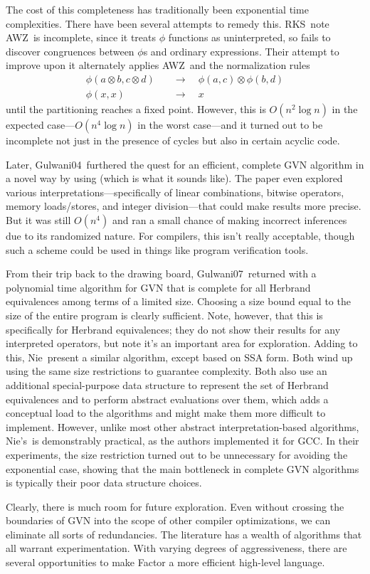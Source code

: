 The cost of this completeness has traditionally been exponential time
complexities.  There have been several attempts to remedy this.
RKS~note AWZ~is incomplete, since it treats $\phi$
functions as uninterpreted, so fails to discover congruences between $\phi$s
and ordinary expressions.  Their attempt to improve upon it alternately applies
AWZ~and the normalization rules
\begin{align*}
  \phi(a\otimes b, c\otimes d) &\quad\to\quad \phi(a,c) \otimes \phi(b,d) \\
  \phi(x, x) &\quad\to\quad x
\end{align*}
until the partitioning reaches a fixed point.  However, this is $O(n^2 \log n)$
in the expected case---$O(n^4 \log n)$ in the worst case---and it turned out to
be incomplete not just in the presence of cycles but also in
certain acyclic code.

Later, Gulwani04~furthered the quest for an efficient, complete
\gls{GVN} algorithm in a novel way by using 
(which is what it sounds like).  The paper even explored various
interpretations---specifically of linear combinations, bitwise operators,
memory loads/stores, and integer division---that could make results more
precise.  But it was still $O(n^4)$ and ran a small chance of making incorrect
inferences due to its randomized nature.  For compilers, this isn't really
acceptable, though such a scheme could be used in things like program
verification tools.

From their trip back to the drawing board, Gulwani07~returned with a
polynomial time algorithm for \gls{GVN} that is complete for all Herbrand
equivalences among terms of a limited size.  Choosing a size bound equal to the
size of the entire program is clearly sufficient.  Note, however, that this is
specifically for Herbrand equivalences; they do not show their results for any
interpreted operators, but note it's an important area for exploration.  Adding
to this, Nie~present a similar algorithm, except based on \gls{SSA}
form.  Both wind up using the same size restrictions to guarantee complexity.
Both also use an additional special-purpose data structure to represent the set
of Herbrand equivalences and to perform abstract evaluations over them, which
adds a conceptual load to the algorithms and might make them more difficult to
implement.  However, unlike most other abstract interpretation-based
algorithms, Nie's~is demonstrably practical, as the authors
implemented it for GCC.  In their experiments, the size restriction
turned out to be unnecessary for avoiding the exponential case, showing that
the main bottleneck in complete \gls{GVN} algorithms is typically their poor
data structure choices.

Clearly, there is much room for future exploration.  Even without crossing the
boundaries of \gls{GVN} into the scope of other compiler optimizations, we can
eliminate all sorts of redundancies.  The literature has a wealth of algorithms
that all warrant experimentation.  With varying degrees of aggressiveness,
there are several opportunities to make Factor a more efficient high-level
language.
